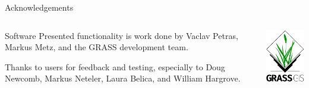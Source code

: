 \documentclass[xcolor={dvipsnames,usenames},beamer,aspectratio=43]{beamer}
\begin{document}
\begin{frame}{Acknowledgements}

\begin{columns}
\begin{column}{0.6\textwidth}

\begin{block}{Software}
Presented functionality is work done by Vaclav Petras, Markus Metz, and the GRASS development team.

\bigskip

Thanks to users for feedback and testing, especially to
Doug Newcomb, Markus Neteler, Laura Belica, and William Hargrove.
\end{block}

\end{column}
\begin{column}{0.3\textwidth}

\begin{center}
  \includegraphics[width=\textwidth]{logos/grass_gis}
\end{center}

\end{column}
\end{columns}

\end{frame}
\end{document}
